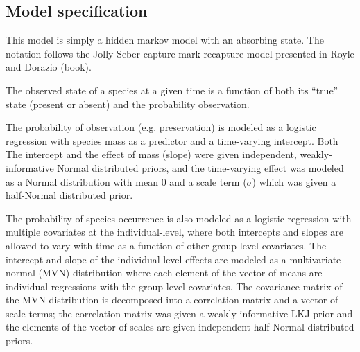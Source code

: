 \documentclass[12pt,letterpaper]{article}
\begin{document}



\subsection*{Model specification}

This model is simply a hidden markov model with an absorbing state. The notation follows the Jolly-Seber capture-mark-recapture model presented in Royle and Dorazio (book).

The observed state of a species at a given time is a function of both its ``true'' state (present or absent) and the probability observation. 

The probability of observation (e.g. preservation) is modeled as a logistic regression with species mass as a predictor and a time-varying intercept. Both The intercept and the effect of mass (slope) were given independent, weakly-informative Normal distributed priors, and the time-varying effect was modeled as a Normal distribution with mean 0 and a scale term (\(\sigma\)) which was given a half-Normal distributed prior.

The probability of species occurrence is also modeled as a logistic regression with multiple covariates at the individual-level, where both intercepts and slopes are allowed to vary with time as a function of other group-level covariates. The intercept and slope of the individual-level effects are modeled as a multivariate normal (MVN) distribution where each element of the vector of means are individual regressions with the group-level covariates. The covariance matrix of the MVN distribution is decomposed into a correlation matrix and a vector of scale terms; the correlation matrix was given a weakly informative LKJ prior and the elements of the vector of scales are given independent half-Normal distributed priors.
\end{document}

